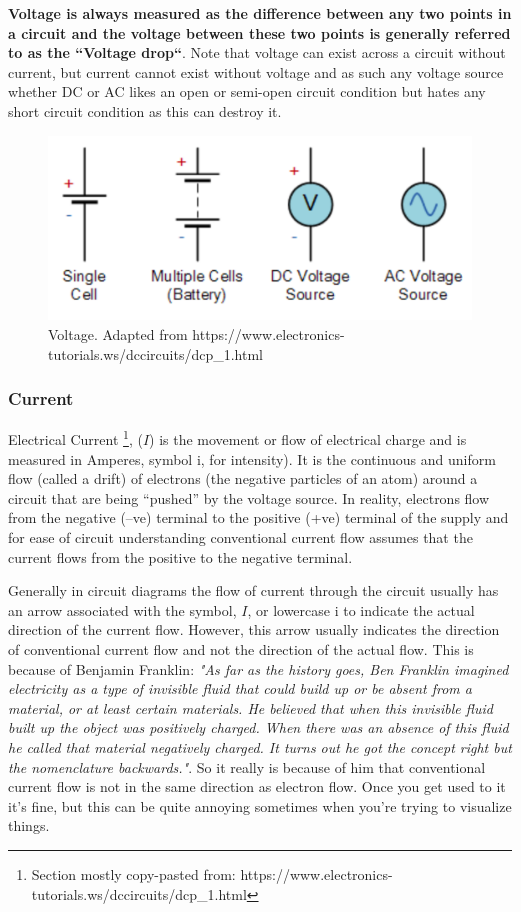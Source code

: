 \textbf{Voltage is always measured as the difference between any two points in a circuit and the voltage between these two points is generally referred to as the “Voltage drop“}. Note that voltage can exist across a circuit without current, but current cannot exist without voltage and as such any voltage source whether DC or AC likes an open or semi-open circuit condition but hates any short circuit condition as this can destroy it.

\begin{figure}[H]
    \centering
    \includegraphics[width=0.65\linewidth]{../../Figures/Voltage.PNG}
    \caption{Voltage. Adapted from https://www.electronics-tutorials.ws/dccircuits/dcp\_1.html}
    \label{fig:Resistors}
\end{figure}

\subsubsection{Current}

Electrical Current \footnote{Section mostly copy-pasted from: https://www.electronics-tutorials.ws/dccircuits/dcp\_1.html}, ($I$) is the movement or flow of electrical charge and is measured in Amperes, symbol i, for intensity). It is the continuous and uniform flow (called a drift) of electrons (the negative particles of an atom) around a circuit that are being “pushed” by the voltage source. In reality, electrons flow from the negative (–ve) terminal to the positive (+ve) terminal of the supply and for ease of circuit understanding conventional current flow assumes that the current flows from the positive to the negative terminal.

Generally in circuit diagrams the flow of current through the circuit usually has an arrow associated with the symbol, $I$, or lowercase i to indicate the actual direction of the current flow. However, this arrow usually indicates the direction of conventional current flow and not the direction of the actual flow. This is because of Benjamin Franklin: \textit{"As far as the history goes, Ben Franklin imagined electricity as a type of invisible fluid that could build up or be absent from a material, or at least certain materials. He believed that when this invisible fluid built up the object was positively charged. When there was an absence of this fluid he called that material negatively charged. It turns out he got the concept right but the nomenclature backwards."}. So it really is because of him that conventional current flow is not in the same direction as electron flow. Once you get used to it it's fine, but this can be quite annoying sometimes when you're trying to visualize things. 

